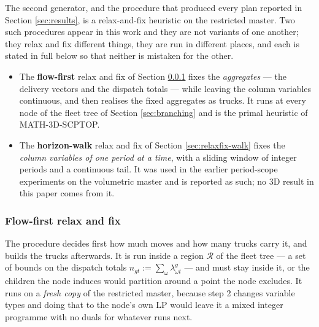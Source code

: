 The second generator, and the procedure that produced every plan
reported in Section \ref{sec:results}, is a relax-and-fix heuristic on
the restricted master. Two such procedures appear in this work and they
are not variants of one another; they relax and fix different things,
they are run in different places, and each is stated in full below so
that neither is mistaken for the other.

\begin{itemize}
\item The \textbf{flow-first} relax and fix of Section
  \ref{sec:relaxfix-flow} fixes the \emph{aggregates} --- the delivery
  vectors and the dispatch totals --- while leaving the column
  variables continuous, and then realises the fixed aggregates as
  trucks. It runs at every node of the fleet tree of Section
  \ref{sec:branching} and is the primal heuristic of MATH-3D-SCPTOP.
\item The \textbf{horizon-walk} relax and fix of Section
  \ref{sec:relaxfix-walk} fixes the \emph{column variables of one
  period at a time}, with a sliding window of integer periods and a
  continuous tail. It was used in the earlier period-scope experiments
  on the volumetric master and is reported as such; no 3D result in
  this paper comes from it.
\end{itemize}

\subsubsection{Flow-first relax and fix}
\label{sec:relaxfix-flow}

The procedure decides first how much moves and how many trucks carry
it, and builds the trucks afterwards. It is run inside a region
$\mathcal{R}$ of the fleet tree --- a set of bounds on the dispatch
totals $n_{gt}:=\sum_{\omega}\lambda^{g}_{\omega t}$ --- and must stay
inside it, or the children the node induces would partition around a
point the node excludes. It runs on a \emph{fresh copy} of the
restricted master, because step 2 changes variable types and doing that
to the node's own LP would leave it a mixed integer programme with no
duals for whatever runs next.

